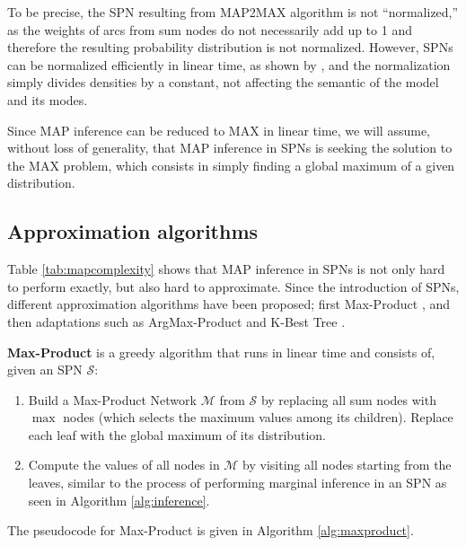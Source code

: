 To be precise, the SPN resulting from MAP2MAX algorithm is not ``normalized,'' as the weights of arcs from sum nodes do not necessarily add up to 1 and therefore the resulting probability distribution is not normalized. However, SPNs can be normalized efficiently in linear time, as shown by \citet{Peharz2015}, and the normalization simply divides densities by a constant, not affecting the semantic of the model and its modes.

Since MAP inference can be reduced to MAX in linear time, we will assume, without loss of generality, that MAP inference in SPNs is seeking the solution to the MAX problem, which consists in simply finding a global maximum of a given distribution.

\subsection{Approximation algorithms}
\label{sec:map:approximate}

Table \ref{tab:mapcomplexity} shows that MAP inference in SPNs is not only hard to perform exactly, but also hard to approximate. Since the introduction of SPNs, different approximation algorithms have been proposed; first Max-Product \citep{Poon2011}, and then adaptations such as ArgMax-Product \citep{Conaty2017} and K-Best Tree \citep{Mei2017}.

\vspace{1em}

\textbf{Max-Product} is a greedy algorithm that runs in linear time and consists of, given an SPN $\mathcal{S}$:

\begin{enumerate}
  \item Build a Max-Product Network $\mathcal{M}$ from $\mathcal{S}$ by replacing all sum nodes with $\max$ nodes (which selects the maximum values among its children). Replace each leaf with the global maximum of its distribution.
  \item Compute the values of all nodes in $\mathcal{M}$ by visiting all nodes starting from the leaves, similar to the process of performing marginal inference in an SPN as seen in Algorithm \ref{alg:inference}.
\end{enumerate}

The pseudocode for Max-Product is given in Algorithm \ref{alg:maxproduct}.

